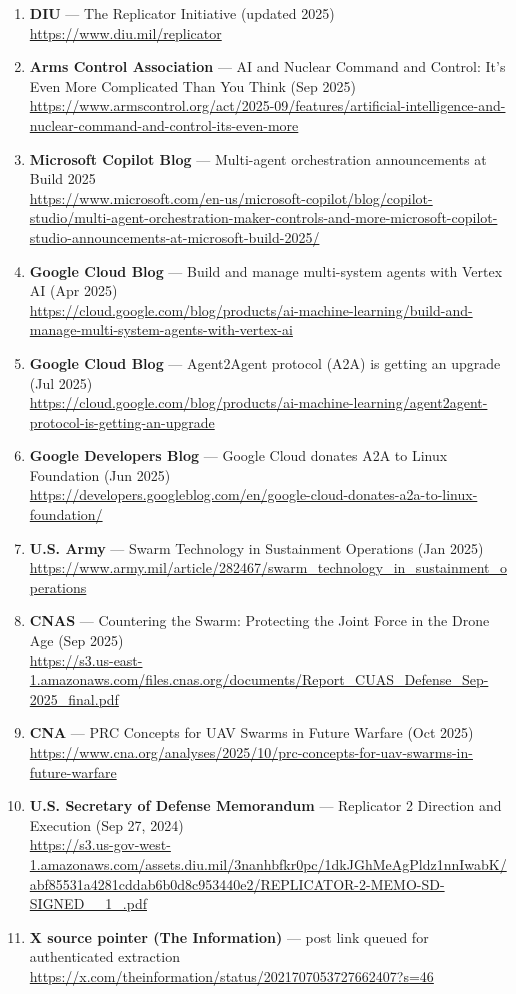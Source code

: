 \documentclass[
]{article}
\begin{document}
\begin{enumerate}
\item
  \textbf{DIU} --- The Replicator Initiative (updated 2025)\\
  \url{https://www.diu.mil/replicator}
\item
  \textbf{Arms Control Association} --- AI and Nuclear Command and
  Control: It's Even More Complicated Than You Think (Sep 2025)\\
  \url{https://www.armscontrol.org/act/2025-09/features/artificial-intelligence-and-nuclear-command-and-control-its-even-more}
\item
  \textbf{Microsoft Copilot Blog} --- Multi-agent orchestration
  announcements at Build 2025\\
  \url{https://www.microsoft.com/en-us/microsoft-copilot/blog/copilot-studio/multi-agent-orchestration-maker-controls-and-more-microsoft-copilot-studio-announcements-at-microsoft-build-2025/}
\item
  \textbf{Google Cloud Blog} --- Build and manage multi-system agents
  with Vertex AI (Apr 2025)\\
  \url{https://cloud.google.com/blog/products/ai-machine-learning/build-and-manage-multi-system-agents-with-vertex-ai}
\item
  \textbf{Google Cloud Blog} --- Agent2Agent protocol (A2A) is getting
  an upgrade (Jul 2025)\\
  \url{https://cloud.google.com/blog/products/ai-machine-learning/agent2agent-protocol-is-getting-an-upgrade}
\item
  \textbf{Google Developers Blog} --- Google Cloud donates A2A to Linux
  Foundation (Jun 2025)\\
  \url{https://developers.googleblog.com/en/google-cloud-donates-a2a-to-linux-foundation/}
\item
  \textbf{U.S. Army} --- Swarm Technology in Sustainment Operations (Jan
  2025)\\
  \url{https://www.army.mil/article/282467/swarm_technology_in_sustainment_operations}
\item
  \textbf{CNAS} --- Countering the Swarm: Protecting the Joint Force in
  the Drone Age (Sep 2025)\\
  \url{https://s3.us-east-1.amazonaws.com/files.cnas.org/documents/Report_CUAS_Defense_Sep-2025_final.pdf}
\item
  \textbf{CNA} --- PRC Concepts for UAV Swarms in Future Warfare (Oct
  2025)\\
  \url{https://www.cna.org/analyses/2025/10/prc-concepts-for-uav-swarms-in-future-warfare}
\item
  \textbf{U.S. Secretary of Defense Memorandum} --- Replicator 2
  Direction and Execution (Sep 27, 2024)\\
  \url{https://s3.us-gov-west-1.amazonaws.com/assets.diu.mil/3nanhbfkr0pc/1dkJGhMeAgPldz1nnIwabK/abf85531a4281cddab6b0d8c953440e2/REPLICATOR-2-MEMO-SD-SIGNED__1_.pdf}
\item
  \textbf{X source pointer (The Information)} --- post link queued for
  authenticated extraction\\
  \url{https://x.com/theinformation/status/2021707053727662407?s=46}
\end{enumerate}
\end{document}
